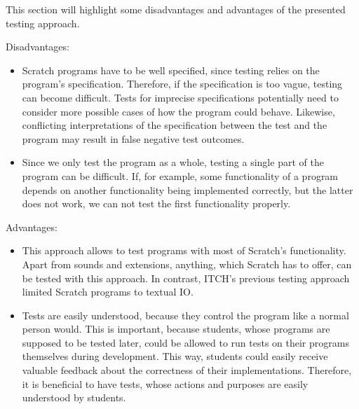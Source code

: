 This section will highlight some disadvantages and advantages of the presented testing approach.


\noindent Disadvantages:

\begin{itemize}
    \item Scratch programs have to be well specified, since testing relies on the program's specification.
        Therefore, if the specification is too vague, testing can become difficult.
        Tests for imprecise specifications potentially need to consider more possible cases of how the program could behave.
        Likewise, conflicting interpretations of the specification between the test and the program may result in false negative test outcomes.
    \item Since we only test the program as a whole, testing a single part of the program can be difficult.
        If, for example, some functionality of a program depends on another functionality being implemented correctly,
        but the latter does not work, we can not test the first functionality properly.
\end{itemize}

\noindent Advantages:

\begin{itemize}
    \item This approach allows to test programs with most of Scratch's functionality.
        Apart from sounds and extensions, anything, which Scratch has to offer, can be tested with this approach.
        In contrast, ITCH's previous testing approach limited Scratch programs to textual IO.
    \item Tests are easily understood, because they control the program like a normal person would.
        This is important, because students, whose programs are supposed to be tested later,
        could be allowed to run tests on their programs themselves during development.
        This way, students could easily receive valuable feedback about the correctness of their implementations.
        Therefore, it is beneficial to have tests, whose actions and purposes are easily understood by students.
\end{itemize}










